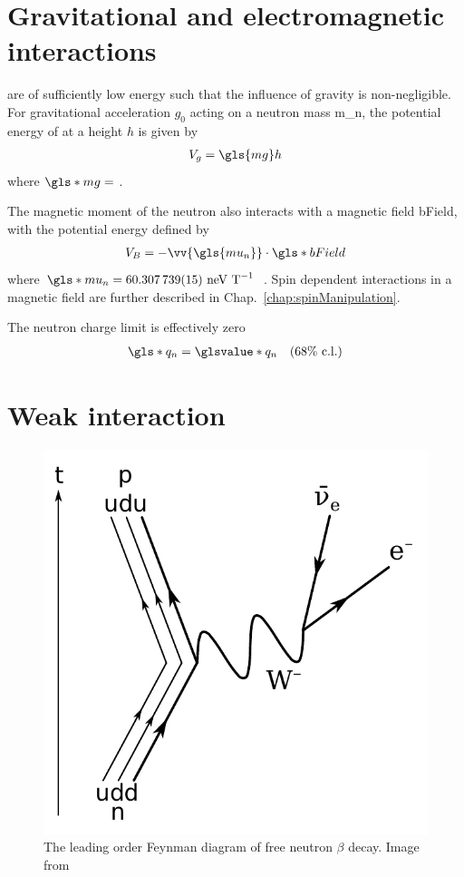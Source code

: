 
\section{Gravitational and electromagnetic interactions}\label{sec:ucn_grav_em}


\ucn are of sufficiently low energy such that the influence of gravity is non-negligible. For gravitational acceleration $g_0$ acting on a neutron mass \gls{m_n}, the potential energy of at a height $h$ is given by
%
\begin{gather}
    V_g = \gls{mg}h
\end{gather}
%
where $\gls*{mg}=$ \cite{codata_2018}.

The magnetic moment of the neutron also interacts with a magnetic field \gls*{bField}, with the potential energy defined by
%
\begin{gather}
    V_B = - \vv{\gls{mu_n}}\cdot \gls*{bField}
\end{gather}
%
where $\gls*{mu_n}=60.307\,739(15)\text{ neV T}^{-1}$~\cite{codata_2018}. Spin dependent interactions in a magnetic field are further described in Chap.~\ref{chap:spinManipulation}.

The neutron charge limit is effectively zero~\cite{baumann_neutron_charge}
%
\begin{gather}
    \gls*{q_n}=\glsvalue*{q_n}\quad(68 \% \text{ c.l.})
\end{gather}


\section{Weak interaction}\label{sec:weak_interaction}


\begin{figure}[htp]
    \centering
    \includegraphics[width=0.3 \textwidth]{figures/beta_negative_decay.pdf}
    \caption[The leading order Feynman diagram of free neutron $\beta$ decay]
    {The leading order  Feynman diagram of free neutron $\beta$ decay. Image from \cite{beta_decay_fig}}
    \label{fig:beta_decay}
\end{figure}

